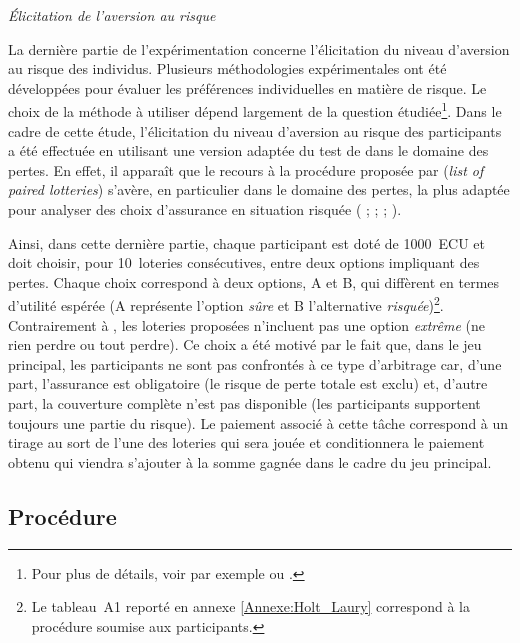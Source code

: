 \begin{Article}
\begin{refsection}[Mouminoux]
\vspace{0,2cm}
\textit{Élicitation de l'aversion au risque}

\vspace{0,2cm}
La dernière partie de l’expérimentation concerne l’élicitation du niveau d’aversion au risque des individus. Plusieurs méthodologies expérimentales ont été développées pour évaluer les préférences individuelles en matière de risque. Le choix de la méthode à utiliser dépend largement de la question étudiée\footnote{Pour plus de détails, voir par exemple \textcite{cgi13} ou \textcite{hr08}.}. Dans le cadre de cette étude, l'élicitation du niveau d'aversion au risque des participants a été effectuée en utilisant une version adaptée du test de \textcite{hl02} dans le domaine des pertes. En effet, il apparaît que le recours à la procédure proposée par \textcite{hl02} (\textit{list of paired lotteries}) s'avère, en particulier dans le domaine des pertes, la plus adaptée pour analyser des choix d’assurance en situation risquée (\textcite{cgov20} ; \textcite{cpm17} ; \textcite{cpm19} ; \textcite{pcm20}).

Ainsi, dans cette dernière partie, chaque participant est doté de 1000~ECU et doit choisir, pour 10~loteries consécutives, entre deux options impliquant des pertes. Chaque choix correspond à deux options, A et B, qui diffèrent en termes d’utilité espérée (A représente l'option \textit{sûre} et B l'alternative \textit{risquée})\footnote{Le tableau~A1 reporté en annexe \ref{Annexe:Holt_Laury} correspond à la procédure soumise aux participants.}. Contrairement à \textcite{cpm17}, les loteries proposées n'incluent pas une option \textit{extrême} (ne rien perdre ou tout perdre). Ce choix a été motivé par le fait que, dans le jeu principal, les participants ne sont pas confrontés à ce type d'arbitrage car, d'une part, l'assurance est obligatoire (le risque de perte totale est exclu) et, d'autre part, la couverture complète n'est pas disponible (les participants supportent toujours une partie du risque). Le paiement associé à cette tâche correspond à un tirage au sort de l’une des loteries qui sera jouée et conditionnera le paiement obtenu qui viendra s’ajouter à la somme gagnée dans le cadre du jeu principal.


\subsection{Procédure}


\end{refsection}
\end{Article}
